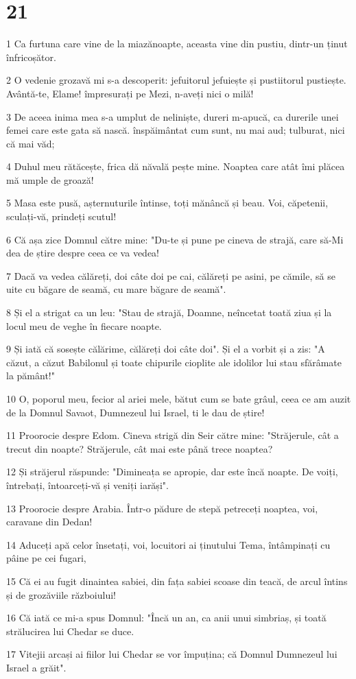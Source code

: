 \chapter{21}

\par 1 Ca furtuna care vine de la miazănoapte, aceasta vine din pustiu, dintr-un ținut înfricoșător.
\par 2 O vedenie grozavă mi s-a descoperit: jefuitorul jefuiește și pustiitorul pustiește. Avântă-te, Elame! împresurați pe Mezi, n-aveți nici o milă!
\par 3 De aceea inima mea s-a umplut de neliniște, dureri m-apucă, ca durerile unei femei care este gata să nască. înspăimântat cum sunt, nu mai aud; tulburat, nici că mai văd;
\par 4 Duhul meu rătăcește, frica dă năvală pește mine. Noaptea care atât îmi plăcea mă umple de groază!
\par 5 Masa este pusă, așternuturile întinse, toți mănâncă și beau. Voi, căpetenii, sculați-vă, prindeți scutul!
\par 6 Că așa zice Domnul către mine: "Du-te și pune pe cineva de strajă, care să-Mi dea de știre despre ceea ce va vedea!
\par 7 Dacă va vedea călăreți, doi câte doi pe cai, călăreți pe asini, pe cămile, să se uite cu băgare de seamă, cu mare băgare de seamă".
\par 8 Și el a strigat ca un leu: "Stau de strajă, Doamne, neîncetat toată ziua și la locul meu de veghe în fiecare noapte.
\par 9 Și iată că sosește călărime, călăreți doi câte doi". Și el a vorbit și a zis: "A căzut, a căzut Babilonul și toate chipurile cioplite ale idolilor lui stau sfărâmate la pământ!"
\par 10 O, poporul meu, fecior al ariei mele, bătut cum se bate grâul, ceea ce am auzit de la Domnul Savaot, Dumnezeul lui Israel, ti le dau de știre!
\par 11 Proorocie despre Edom. Cineva strigă din Seir către mine: "Străjerule, cât a trecut din noapte? Străjerule, cât mai este până trece noaptea?
\par 12 Și străjerul răspunde: "Dimineața se apropie, dar este încă noapte. De voiți, întrebați, întoarceți-vă și veniți iarăși".
\par 13 Proorocie despre Arabia. Într-o pădure de stepă petreceți noaptea, voi, caravane din Dedan!
\par 14 Aduceți apă celor însetați, voi, locuitori ai ținutului Tema, întâmpinați cu pâine pe cei fugari,
\par 15 Că ei au fugit dinaintea sabiei, din fața sabiei scoase din teacă, de arcul întins și de grozăviile războiului!
\par 16 Că iată ce mi-a spus Domnul: "Încă un an, ca anii unui simbriaș, și toată strălucirea lui Chedar se duce.
\par 17 Vitejii arcași ai fiilor lui Chedar se vor împuțina; că Domnul Dumnezeul lui Israel a grăit".

